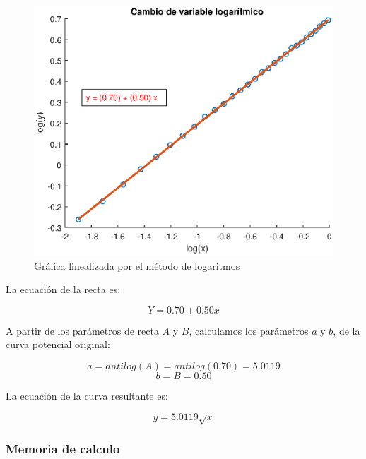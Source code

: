 \documentclass[letter,11pt]{article}
\begin{document}
\begin{figure}[!h]
\centering
\includegraphics[scale=1.00]{eps/3.4.2.eps}
\caption{Gráfica linealizada por el método de logaritmos}
\label{practica34_2}
\end{figure}

La ecuación de la recta es:

\begin{equation}
    Y = 0.70 + 0.50 x
\end{equation}

A partir de los parámetros de recta $A$ y $B$, calculamos los parámetros $a$ y
$b$, de la curva potencial original:

\begin{equation*}
    a = antilog(A) = antilog(0.70) = 5.0119
\end{equation*}
\begin{equation*}
    b = B = 0.50
\end{equation*}

La ecuación de la curva resultante es:

\begin{equation}
    y = 5.0119 \sqrt{x}
\end{equation}

\subsubsection{Memoria de calculo}

\begin{alltt}
\footnotesize

\normalsize
\end{alltt}
\end{document}
